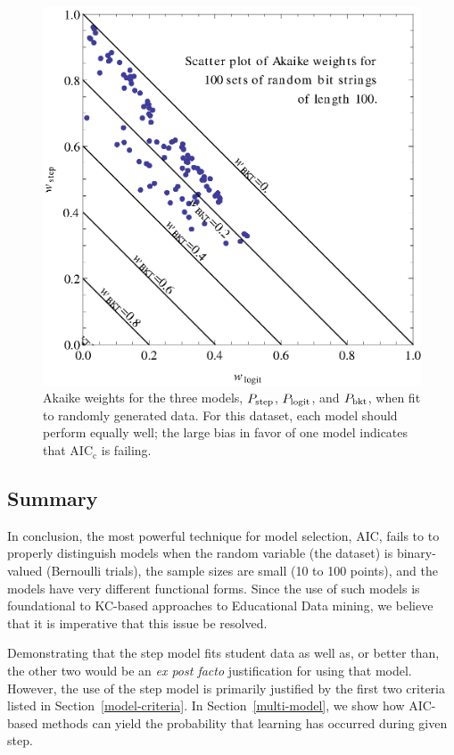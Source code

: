 \documentclass[11pt,letterpaper]{article}
\begin{document}
\begin{figure}
  \centering \includegraphics{scatter-random-weights.eps}
  \caption{Akaike weights for the three models, $P_{\rm step}$,
   $P_{\rm logit}$, and $P_{\rm bkt}$, when fit to randomly
   generated data.  For this dataset, each model should perform
   equally well; the large bias in favor of one model indicates
   that  AIC$_{\mathrm c}$ is failing.\label{scatter2}}
\end{figure}

\subsection{Summary}

In conclusion, the most powerful technique for model selection,
AIC, fails to to properly distinguish models when the random
variable (the dataset) is binary-valued (Bernoulli trials),
the sample sizes are small (10 to 100 points), and the models
have very different functional forms.  Since the use of such
models is foundational to KC-based approaches to Educational
Data mining, we believe that it is imperative that this issue 
be resolved.

Demonstrating that the step model fits student data as well as,
or better than, the other two would be an
{\em ex post facto} justification for using that model.  
However, the use of the step model is primarily justified
by the first two criteria listed in Section~\ref{model-criteria}.
In Section~\ref{multi-model}, we show how AIC-based methods
can yield the probability that learning has occurred during given step.
\end{document}
